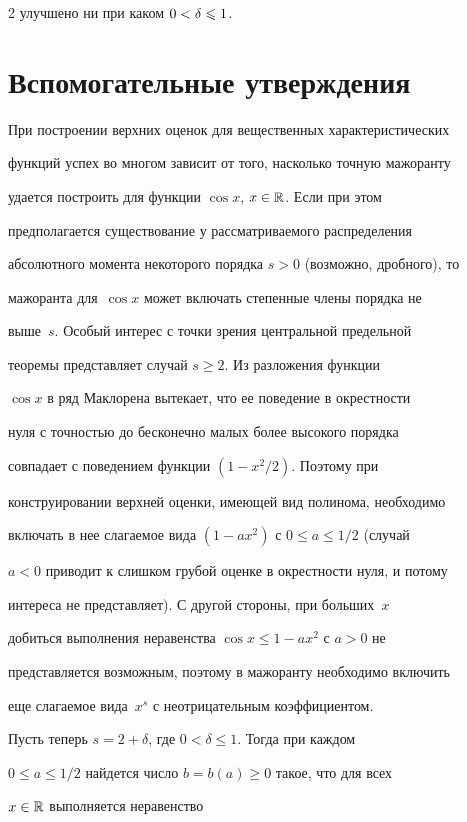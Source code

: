 \begin{multicols}{2}
улучшено ни при каком $0<\delta\leqslant1$.



\section{Вспомогательные утверждения}



При построении верхних оценок для вещественных характеристических

функций успех во многом зависит от того, насколько точную мажоранту

удается построить для функции $\cos x$, $x\in\mathbb R$. Если при этом

предполагается существование у рас\-смат\-ри\-ва\-емо\-го распределения

абсолютного момента некоторого порядка $s>0$ (возможно, дробного), то

мажоранта для~$\cos x$ может включать степенные члены порядка не

выше~$s$. Особый интерес с точки зрения центральной предельной

теоремы пред\-став\-ля\-ет случай $s\ge 2$. Из разложения функции

$\cos x$ в ряд Маклорена вытекает, что ее поведение в окрест\-ности

нуля с точностью до бесконечно малых более высокого порядка

совпадает с поведением функции $(1-x^2/2)$. Поэтому при

конструировании верхней оценки, имеющей вид полинома, необходимо

включать в нее слагаемое вида $(1-ax^2)$ с $0\le a\le1/2$ (случай

$a<0$ приводит к слишком грубой оценке в окрестности нуля, и потому

интереса не представляет). С другой стороны, при больших~$x$

добиться выполнения неравенства $\cos x\le 1-ax^2$ с $a>0$ не

представляется возможным, поэтому в мажоранту необходимо включить

еще слагаемое вида~$x^s$ с неотрицательным коэффициентом.



Пусть теперь $s=2+\delta$, где $0<\delta\le1$. Тогда при каждом

$0\le a\le1/2$ найдется число $b=b(a)\ge 0$ такое, что для всех

$x\in\mathbb R$ выполняется неравенство


\end{multicols}
